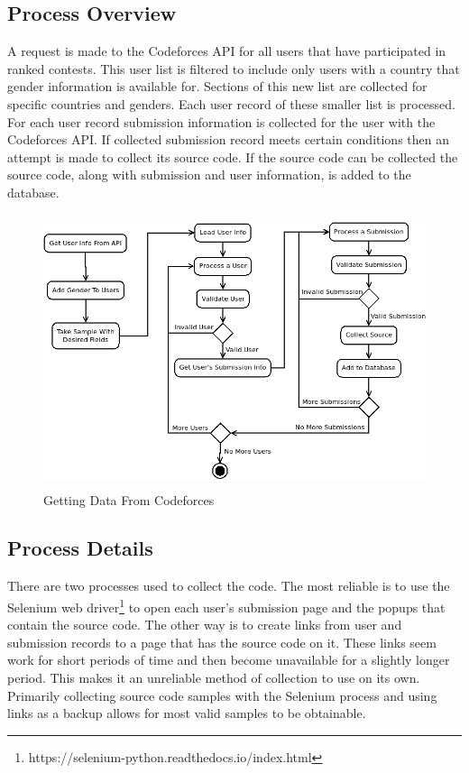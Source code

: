 \documentclass[12pt]{article}
\begin{document}
\subsection{Process Overview}
A request is made to the Codeforces API for all users that have participated in ranked contests. This user list is filtered to include only users with a country that gender information is available for. Sections of this new list are collected for specific countries and genders. Each user record of these smaller list is processed. For each user record submission information is collected for the user with the Codeforces API. If collected submission record meets certain conditions then an attempt is made to collect its source code. If the source code can be collected the source code, along with submission and user information, is added to the database.

\begin{figure}[!h]
    \centering
    \includegraphics[height=8cm]{diagrams/cf_process.png}
    \caption{Getting Data From Codeforces}
\end{figure}

\subsection{Process Details}
There are two processes used to collect the code. The most reliable is to use the Selenium web driver\footnote{https://selenium-python.readthedocs.io/index.html} to open each user's submission page and the popups that contain the source code. The other way is to create links from user and submission records to a page that has the source code on it. These links seem work for short periods of time and then become unavailable for a slightly longer period. This makes it an unreliable method of collection to use on its own. Primarily collecting source code samples with the Selenium process and using links as a backup allows for most valid samples to be obtainable.
\end{document}
